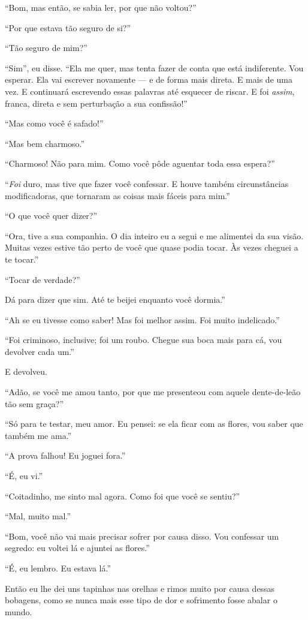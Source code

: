 “Bom, mas então, se sabia ler, por que não voltou?”

“Por que estava tão seguro de si?”

“Tão seguro de mim?”

“Sim”, eu disse. “Ela me quer, mas tenta fazer de conta que está indiferente. Vou
esperar. Ela vai escrever novamente --- e de forma mais direta. E mais de uma vez. E
continuará escrevendo essas palavras até esquecer de riscar. E foi
\textit{assim}, franca, direta e sem perturbação a sua confissão!”     

“Mas como você é safado!”

“Mas bem charmoso.”

“Charmoso! Não para mim. Como você pôde
aguentar toda essa espera?”

``\textit{Foi} duro, mas tive que fazer você confessar. E houve também
circunstâncias modificadoras, que tornaram as coisas mais fáceis para
mim.''

“O que você quer dizer?”

“Ora, tive a sua companhia. O dia inteiro eu a segui e me alimentei da sua visão. Muitas
vezes estive tão perto de você que quase podia tocar. Às vezes cheguei a te tocar.”

“Tocar de verdade?”

Dá para dizer que sim. Até te beijei enquanto você dormia.”

“Ah se eu tivesse como saber! Mas foi melhor assim. Foi muito indelicado.”

“Foi criminoso, inclusive; foi um roubo. Chegue sua boca mais para cá, vou devolver cada um.”

E devolveu.

“Adão, se você me amou tanto, por que me presenteou com aquele dente-de-leão
tão sem graça?”

“Só para te testar, meu amor. Eu pensei: se ela ficar com as flores, vou saber
que também me ama.”

“A prova falhou! Eu joguei fora.”

“É, eu vi.”

“Coitadinho, me sinto mal agora. Como foi que você se sentiu?”

“Mal, muito mal.”

“Bom, você não vai mais precisar sofrer por causa disso. Vou confessar um segredo: eu
voltei lá e ajuntei as flores.”

“É, eu lembro. Eu estava lá.”

Então eu lhe dei uns tapinhas nas orelhas e rimos muito por causa dessas bobagens, 
como se nunca mais esse tipo de dor e sofrimento fosse abalar o mundo.


